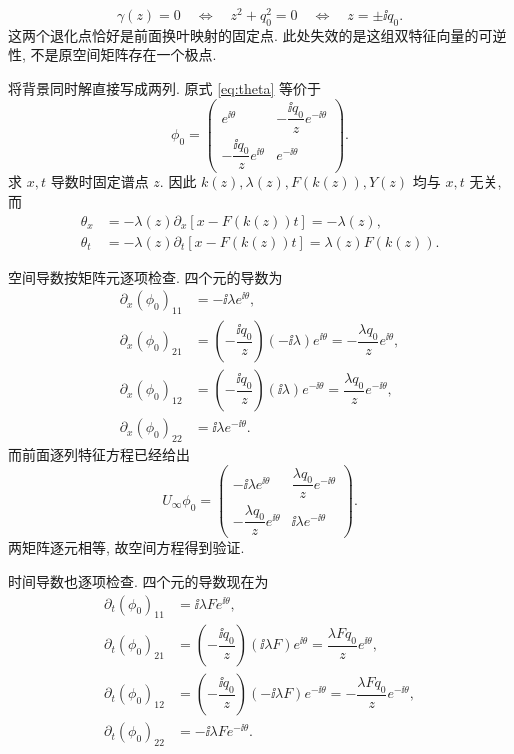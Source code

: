 \begin{equation*}
\gamma(z)=0
\quad\Longleftrightarrow\quad
z^2+q_0^2=0
\quad\Longleftrightarrow\quad
z=\pm\ii q_0.
\end{equation*}
这两个退化点恰好是前面换叶映射的固定点. 此处失效的是这组双特征向量的可逆性, 不是原空间矩阵存在一个极点.
\par\smallskip\noindent 将背景同时解直接写成两列.\quad
原式 \eqref{eq:theta} 等价于
\begin{equation*}
\phi_0=
\begin{pmatrix}
e^{\ii\theta}&-\dfrac{\ii q_0}{z}e^{-\ii\theta}\\
-\dfrac{\ii q_0}{z}e^{\ii\theta}&e^{-\ii\theta}
\end{pmatrix}.
\end{equation*}
求 $x,t$ 导数时固定谱点 $z$. 因此 $k(z),\lambda(z),F(k(z)),Y(z)$ 均与 $x,t$ 无关, 而
\begin{align*}
\theta_x
&=-\lambda(z)\partial_x[x-F(k(z))t]
=-\lambda(z),\\
\theta_t
&=-\lambda(z)\partial_t[x-F(k(z))t]
=\lambda(z)F(k(z)).
\end{align*}
\par\smallskip\noindent 空间导数按矩阵元逐项检查.\quad
四个元的导数为
\begin{align*}
\partial_x(\phi_0)_{11}
&=-\ii\lambda e^{\ii\theta},\\
\partial_x(\phi_0)_{21}
&=\left(-\dfrac{\ii q_0}{z}\right)(-\ii\lambda)e^{\ii\theta}
=-\dfrac{\lambda q_0}{z}e^{\ii\theta},\\
\partial_x(\phi_0)_{12}
&=\left(-\dfrac{\ii q_0}{z}\right)(\ii\lambda)e^{-\ii\theta}
=\dfrac{\lambda q_0}{z}e^{-\ii\theta},\\
\partial_x(\phi_0)_{22}
&=\ii\lambda e^{-\ii\theta}.
\end{align*}
而前面逐列特征方程已经给出
\begin{equation*}
U_\infty\phi_0=
\begin{pmatrix}
-\ii\lambda e^{\ii\theta}
&\dfrac{\lambda q_0}{z}e^{-\ii\theta}\\
-\dfrac{\lambda q_0}{z}e^{\ii\theta}
&\ii\lambda e^{-\ii\theta}
\end{pmatrix}.
\end{equation*}
两矩阵逐元相等, 故空间方程得到验证.
\par\smallskip\noindent 时间导数也逐项检查.\quad
四个元的导数现在为
\begin{align*}
\partial_t(\phi_0)_{11}
&=\ii\lambda F e^{\ii\theta},\\
\partial_t(\phi_0)_{21}
&=\left(-\dfrac{\ii q_0}{z}\right)(\ii\lambda F)e^{\ii\theta}
=\dfrac{\lambda Fq_0}{z}e^{\ii\theta},\\
\partial_t(\phi_0)_{12}
&=\left(-\dfrac{\ii q_0}{z}\right)(-\ii\lambda F)e^{-\ii\theta}
=-\dfrac{\lambda Fq_0}{z}e^{-\ii\theta},\\
\partial_t(\phi_0)_{22}
&=-\ii\lambda F e^{-\ii\theta}.
\end{align*}
